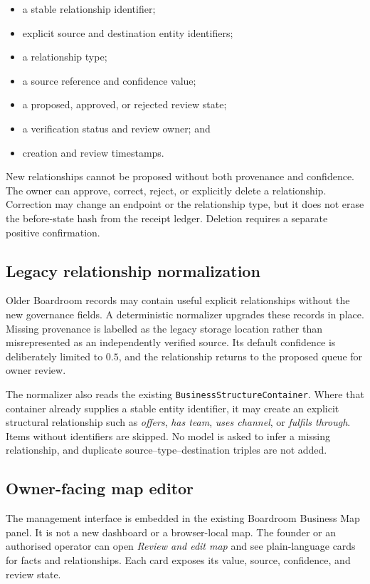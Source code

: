 \begin{itemize}
  \item a stable relationship identifier;
  \item explicit source and destination entity identifiers;
  \item a relationship type;
  \item a source reference and confidence value;
  \item a proposed, approved, or rejected review state;
  \item a verification status and review owner; and
  \item creation and review timestamps.
\end{itemize}

New relationships cannot be proposed without both provenance and confidence.
The owner can approve, correct, reject, or explicitly delete a relationship.
Correction may change an endpoint or the relationship type, but it does not
erase the before-state hash from the receipt ledger.  Deletion requires a
separate positive confirmation.

\subsection{Legacy relationship normalization}

Older Boardroom records may contain useful explicit relationships without the
new governance fields.  A deterministic normalizer upgrades these records in
place.  Missing provenance is labelled as the legacy storage location rather
than misrepresented as an independently verified source.  Its default
confidence is deliberately limited to \(0.5\), and the relationship returns to
the proposed queue for owner review.

The normalizer also reads the existing \texttt{BusinessStructureContainer}.
Where that container already supplies a stable entity identifier, it may create
an explicit structural relationship such as \emph{offers}, \emph{has team},
\emph{uses channel}, or \emph{fulfils through}.  Items without identifiers are
skipped.  No model is asked to infer a missing relationship, and duplicate
source--type--destination triples are not added.

\subsection{Owner-facing map editor}

The management interface is embedded in the existing Boardroom Business Map
panel.  It is not a new dashboard or a browser-local map.  The founder or an
authorised operator can open \emph{Review and edit map} and see plain-language
cards for facts and relationships.  Each card exposes its value, source,
confidence, and review state.

